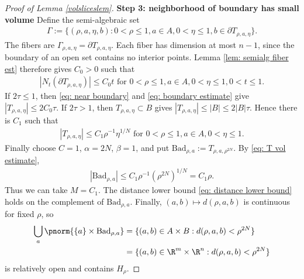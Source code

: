 \documentclass{article}
\numberwithin{equation}{section}
\theoremstyle{plain}
\begin{document}
\begin{proof}[Proof of Lemma \ref{volsliceslem}]
    \noindent \textbf{Step 3: neighborhood of boundary has small volume}
    Define the semi-algebraic set 
    \begin{align}
        \Gamma :=\{(\rho,a,\eta,b) : 0 < \rho \leq 1, a \in A, 0 < \eta \leq 1, b \in \partial T_{\rho,a,\eta}\}.
    \end{align}
    The fibers are $\Gamma_{\rho,a,\eta} = \partial T_{\rho,a,\eta}$. Each fiber has dimension at most $n-1$, since the boundary of an open set contains no interior points. Lemma \ref{lem: semialg fiber est} therefore gives $C_0 > 0$ such that 
    \begin{align}
        |N_t(\partial T_{\rho,a,\eta})| \leq C_0 t \text{ for $0 < \rho \leq 1, a \in A, 0 < \eta \leq 1, 0 < t \leq 1$}. \label{eq: boundary estimate}
    \end{align}
    If $2\tau \leq 1$, then \eqref{eq: near boundary} and \eqref{eq: boundary estimate} give $|T_{\rho,a,\eta}| \leq 2C_0 \tau$. If $2\tau > 1$, then $T_{\rho,a,\eta} \subset B$ gives $|T_{\rho,a,\eta}| \leq |B| \leq 2|B| \tau$. Hence there is $C_1$ such that 
    \begin{align}
        |T_{\rho,a,\eta}| \leq C_1 \rho^{-1} \eta^{1/N} \text{ for $0 < \rho \leq 1, a \in A, 0 < \eta \leq 1$}. \label{eq: T vol estimate}
    \end{align}
    Finally choose $C=1$, $\alpha = 2N$, $\beta = 1$, and put 
    $\mathrm{Bad}_{\rho,a} :=T_{\rho,a,\rho^{2N}}$. By \eqref{eq: T vol estimate}, 
    \begin{align}
        |\mathrm{Bad}_{\rho,a}| \leq C_1 \rho^{-1} (\rho^{2N})^{1/N} = C_1 \rho.
    \end{align}
    Thus we can take $M = C_1$. The distance lower bound \eqref{eq: distance lower bound} holds on the complement of $\mathrm{Bad}_{\rho,a}$. Finally, $(a,b) \mapsto d(\rho,a,b)$ is continuous for fixed $\rho$, so
    \begin{align}
        \bigcup_a\pnorm{
        \{a\}\times \mathrm{Bad}_{\rho,a}
        }  &= \{(a,b) \in A \times B : d(\rho,a,b) < \rho^{2N}\} \\
        &= \{(a,b) \in \R^m \times \R^n : d(\rho,a,b) < \rho^{2N}\} 
    \end{align}
    is relatively open and contains $H_\rho$. 
\end{proof}
\end{document}
